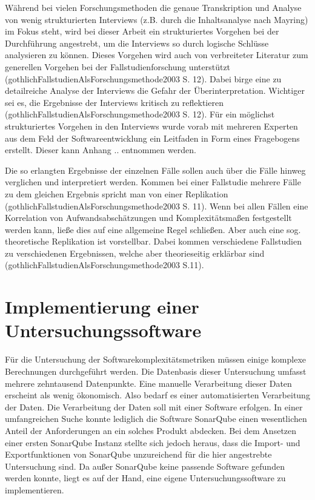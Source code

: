 Während bei vielen Forschungsmethoden die genaue Transkription und
Analyse von wenig strukturierten Interviews (z.B. durch die
Inhaltsanalyse nach Mayring) im Fokus steht, wird bei dieser Arbeit ein
strukturiertes Vorgehen bei der Durchführung angestrebt, um die
Interviews so durch logische Schlüsse analysieren zu können. Dieses
Vorgehen wird auch von verbreiteter Literatur zum generellen Vorgehen
bei der Fallstudienforschung unterstützt
(gothlichFallstudienAlsForschungsmethode2003 S. 12). Dabei birge eine zu
detailreiche Analyse der Interviews die Gefahr der Überinterpretation.
Wichtiger sei es, die Ergebnisse der Interviews kritisch zu reflektieren
(gothlichFallstudienAlsForschungsmethode2003 S. 12). Für ein möglichst
strukturiertes Vorgehen in den Interviews wurde vorab mit mehreren
Experten aus dem Feld der Softwareentwicklung ein Leitfaden in Form
eines Fragebogens erstellt. Dieser kann Anhang .. entnommen werden.

Die so erlangten Ergebnisse der einzelnen Fälle sollen auch über die
Fälle hinweg verglichen und interpretiert werden. Kommen bei einer
Fallstudie mehrere Fälle zu dem gleichen Ergebnis spricht man von einer
Replikation (gothlichFallstudienAlsForschungsmethode2003 S. 11). Wenn
bei allen Fällen eine Korrelation von Aufwandsabschätzungen und
Komplexitätsmaßen festgestellt werden kann, ließe dies auf eine
allgemeine Regel schließen. Aber auch eine sog. theoretische Replikation
ist vorstellbar. Dabei kommen verschiedene Fallstudien zu verschiedenen
Ergebnissen, welche aber theorieseitig erklärbar sind
(gothlichFallstudienAlsForschungsmethode2003 S.11).

\section{Implementierung einer
Untersuchungssoftware}\label{implementierung-einer-untersuchungssoftware}

Für die Untersuchung der Softwarekomplexitätsmetriken müssen einige
komplexe Berechnungen durchgeführt werden. Die Datenbasis dieser
Untersuchung umfasst mehrere zehntausend Datenpunkte. Eine manuelle
Verarbeitung dieser Daten erscheint als wenig ökonomisch. Also bedarf es
einer automatisierten Verarbeitung der Daten. Die Verarbeitung der Daten
soll mit einer Software erfolgen. In einer umfangreichen Suche konnte
lediglich die Software SonarQube einen wesentlichen Anteil der
Anforderungen an ein solches Produkt abdecken. Bei dem Ansetzen einer
ersten SonarQube Instanz stellte sich jedoch heraus, dass die Import-
und Exportfunktionen von SonarQube unzureichend für die hier angestrebte
Untersuchung sind. Da außer SonarQube keine passende Software gefunden
werden konnte, liegt es auf der Hand, eine eigene Untersuchungssoftware
zu implementieren.

